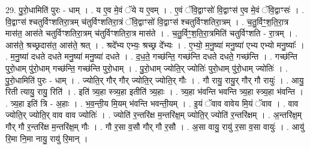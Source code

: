 \documentclass[17pt]{extarticle}
\begin{document}
29. पु॒रो॒धामिति॑ पुरः - धाम् । . य ए॒व मे॒वं ॅये य ए॒वम् । . ए॒वं ॅवि॒द्वाꣳसो॑ वि॒द्वाꣳस॑ ए॒व मे॒वं ॅवि॒द्वाꣳसः॑ । . वि॒द्वाꣳस॑ श्चतुर्विꣳशतिरा॒त्रम् च॑तुर्विꣳशतिरा॒त्रं ॅवि॒द्वाꣳसो॑ वि॒द्वाꣳस॑ श्चतुर्विꣳशतिरा॒त्रम् । . च॒तु॒र्विꣳ॒॒श॒ति॒रा॒त्र मास॑त॒ आस॑ते चतुर्विꣳशतिरा॒त्रम् च॑तुर्विꣳशतिरा॒त्र मास॑ते । . च॒तु॒र्विꣳ॒॒श॒ति॒रा॒त्रमिति॑ चतुर्विꣳशति - रा॒त्रम् । . आस॑ते॒ श्रच्छ्रदास॑त॒ आस॑ते॒ श्रत् । . श्रदे᳚भ्य एभ्यः॒ श्रच्छ्र दे᳚भ्यः । . ए॒भ्यो॒ म॒नु॒ष्या॑ मनु॒ष्या॑ एभ्य एभ्यो मनु॒ष्याः᳚ । . म॒नु॒ष्या॑ दधते दधते मनु॒ष्या॑ मनु॒ष्या॑ दधते । . द॒ध॒ते॒ गच्छ॑न्ति॒ गच्छ॑न्ति दधते दधते॒ गच्छ॑न्ति । . गच्छ॑न्ति पुरो॒धाम् पु॑रो॒धाम् गच्छ॑न्ति॒ गच्छ॑न्ति पुरो॒धाम् । . पु॒रो॒धाम् ज्योति॒र् ज्योतिः॑ पुरो॒धाम् पु॑रो॒धाम् ज्योतिः॑ । . पु॒रो॒धामिति॑ पुरः - धाम् । . ज्योति॒र् गौर् गौर् ज्योति॒र् ज्योति॒र् गौः । . गौ रायु॒ रायु॒र् गौर् गौ रायुः॑ । . आयु॒ रिती त्यायु॒ रायु॒ रिति॑ । . इति॑ त्र्य॒हा स्त्र्य॒हा इतीति॑ त्र्य॒हाः । . त्र्य॒हा भ॑वन्ति भवन्ति त्र्य॒हा स्त्र्य॒हा भ॑वन्ति । . त्र्य॒हा इति॑ त्रि - अ॒हाः । . भ॒व॒न्ती॒य मि॒यम् भ॑वन्ति भवन्ती॒यम् । . इ॒यं ॅवाव वावेय मि॒यं ॅवाव । . वाव ज्योति॒र् ज्योति॒र् वाव वाव ज्योतिः॑ । . ज्योति॑ र॒न्तरि॑क्ष म॒न्तरि॑क्ष॒म् ज्योति॒र् ज्योति॑ र॒न्तरि॑क्षम् । . अ॒न्तरि॑क्ष॒म् गौर् गौ र॒न्तरि॑क्ष म॒न्तरि॑क्ष॒म् गौः । . गौ र॒सा व॒सौ गौर् गौ र॒सौ । . अ॒सा वायु॒ रायु॑ र॒सा व॒सा वायुः॑ । . आयु॑ रि॒मा नि॒मा नायु॒ रायु॑ रि॒मान् । \newline
\end{document}
